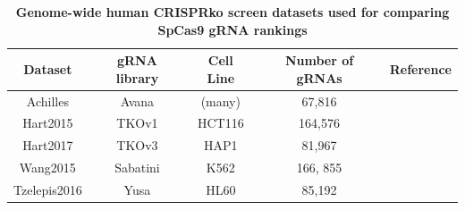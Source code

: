 \documentclass[pdftex,english,10pt]{article}
\begin{document}
{%
\begin{table}[]
\centering 
\begin{tabular}{c|c|c|c|c}
Dataset   & gRNA library  & Cell Line & Number of gRNAs  & Reference \\ \hline
Achilles  & Avana   & (many)   & 67,816  &       \citep{ceres}    \\
Hart2015 & TKOv1  &  HCT116     & 164,576 &         \citep{toronto1}       \\
Hart2017 & TKOv3    & HAP1        & 81,967 &     \citep{toronto3}         \\
Wang2015 & Sabatini & K562      &166, 855 &          \citep{sabatini}     \\
Tzelepis2016  &     Yusa     &  HL60     &   85,192 &         \citep{yusa}  
\end{tabular}
\caption{\textbf{Genome-wide human CRISPRko screen datasets used for comparing SpCas9 gRNA rankings}}
\label{tab:screens}
\end{table}




}
\end{document}
